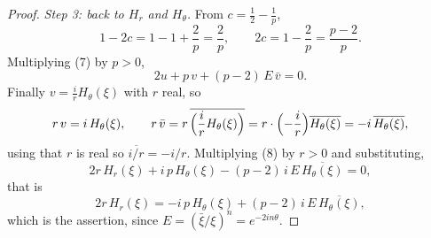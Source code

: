 \begin{proof}
\emph{Step 3: back to $H_r$ and $H_\theta$.}  From $c=\tfrac12-\tfrac1p$,
\[
  1-2c=1-1+\frac2p=\frac2p,\qquad 2c=1-\frac2p=\frac{p-2}{p}.
\]
Multiplying (7) by $p>0$,
\begin{equation}\tag{8}
  2u+p\,v+(p-2)\,E\,\bar v=0 .
\end{equation}
Finally $v=\frac ir H_\theta(\xi)$ with $r$ real, so
\[
  r\,v=i\,H_\theta(\xi),
  \qquad
  r\,\bar v=r\,\overline{\Bigl(\frac ir H_\theta(\xi)\Bigr)}
  =r\cdot\Bigl(-\frac ir\Bigr)\overline{H_\theta(\xi)}
  =-i\,\overline{H_\theta(\xi)} ,
\]
using that $r$ is real so $\overline{i/r}=-i/r$.  Multiplying (8) by $r>0$ and substituting,
\[
  2r\,H_r(\xi)+i\,p\,H_\theta(\xi)-(p-2)\,i\,E\,\overline{H_\theta(\xi)}=0,
\]
that is
\[
  2r\,H_r(\xi)=-i\,p\,H_\theta(\xi)+(p-2)\,i\,E\,\overline{H_\theta(\xi)},
\]
which is the assertion, since $E=(\bar\xi/\xi)^{n}=e^{-2in\theta}$.
\end{proof}
